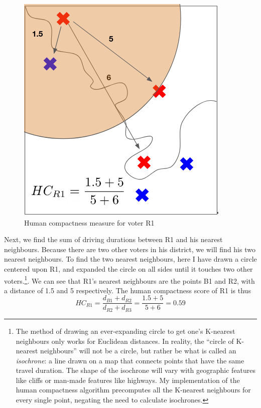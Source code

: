 \documentclass[]{article}
\begin{document}
\begin{figure}
\centering
\includegraphics{img/human_compactness_2a.png}
\caption{Human compactness measure for voter R1 \label{hc_r1}}
\end{figure}

Next, we find the sum of driving durations between R1 and his nearest
neighbours. Because there are two other voters in his district, we will
find his two nearest neighbours. To find the two nearest neighbours,
here I have drawn a circle centered upon R1, and expanded the circle on
all sides until it touches two other voters.\footnote{The method of
  drawing an ever-expanding circle to get one's K-nearest neighbours
  only works for Euclidean distances. In reality, the ``circle of
  K-nearest neighbours'' will not be a circle, but rather be what is
  called an \emph{isochrone}: a line drawn on a map that connects points
  that have the same travel duration. The shape of the isochrone will
  vary with geographic features like cliffs or man-made features like
  highways. My implementation of the human compactness algorithm
  precomputes all the K-nearest neighbours for every single point,
  negating the need to calculate isochrones.}. We can see that R1's
nearest neighbours are the points B1 and R2, with a distance of 1.5 and
5 respectively. The human compactness score of R1 is thus
\[HC_{R1} = \frac{d_{B1}+d_{R2}}{d_{R2} +
d_{R3}} = \frac{1.5 + 5}{5+6} = 0.59\]
\end{document}
